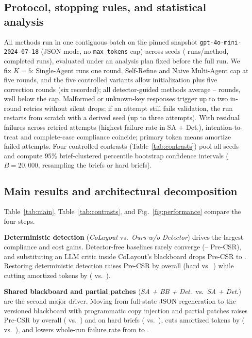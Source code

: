 \documentclass[conference]{IEEEtran}
\begin{document}
\subsection{Protocol, stopping rules, and statistical analysis}
All \vMethodCount{} methods run in one contiguous batch on the pinned snapshot
\texttt{gpt-4o-mini-2024-07-18} (JSON mode, no \texttt{max\_\allowbreak tokens}
cap) across \vSeedCount{} seeds (\vRunsPerMethod{} runs/method, \vRunsTotal{}
completed runs), evaluated under an analysis plan fixed before the full run. We
fix $K=5$: Single-Agent runs one round, Self-Refine and Naive Multi-Agent cap at
five rounds, and the five controlled variants allow initialization plus five
correction rounds (six recorded); all detector-guided methods average
\vRndFull--\vRndSADet{} rounds, well below the cap. Malformed or unknown-key
responses trigger up to two in-round retries without silent drops; if an attempt
still fails validation, the run restarts from scratch with a derived seed (up to
three attempts). With \vResidualFail{} residual failures across
\vFailAttemptsTotal{} retried attempts (highest failure rate \vFailRateMax{} in
SA + Det.), intention-to-treat and complete-case compliance coincide; primary
token means amortize failed attempts. Four controlled contrasts
(Table~\ref{tab:contrasts}) pool all \vSeedCount{} seeds and compute 95\%
brief-clustered percentile bootstrap confidence intervals ($B=20{,}000$,
resampling the \vBriefCount{} briefs or \vHardBriefCount{} hard briefs).

\subsection{Main results and architectural decomposition}
Table~\ref{tab:main}, Table~\ref{tab:contrasts}, and Fig.~\ref{fig:performance}
compare the four steps.

\textbf{Deterministic detection} (\emph{CoLayout} vs.\ \emph{Ours w/o
Detector}) drives the largest compliance and cost gains.
Detector-free baselines rarely converge (\vPreSA--\vPreNaive{} Pre-CSR), and
substituting an LLM critic inside CoLayout's blackboard drops Pre-CSR to
\vPreNoDet{}. Restoring deterministic detection raises Pre-CSR by \vDPreDet{}
overall (hard \vPreFullHard{} vs.\ \vPreNoDetHard{}) while cutting amortized
tokens by \vTokCutDetPct{} (\vTokFull{} vs.\ \vTokNoDet{}).

\textbf{Shared blackboard and partial patches} (\emph{SA + BB + Det.}\ vs.\
\emph{SA + Det.}) are the second major driver. Moving from full-state JSON
regeneration to the versioned blackboard with programmatic copy injection and
partial patches raises Pre-CSR by \vDPreBB{} overall (\vPreSABB{} vs.\
\vPreSADet{}) and \vDPreBBHard{} on hard briefs (\vPreSABBHard{} vs.\
\vPreSADetHard{}), cuts amortized tokens by \vTokCutBBPct{} (\vTokSABB{} vs.\
\vTokSADet{}), and lowers whole-run failure rate from \vFailRateSADet{} to
\vFailRateSABB{}.
\end{document}

